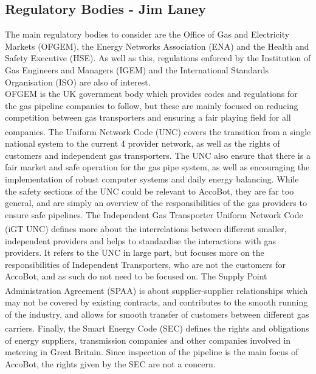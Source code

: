 \documentclass[11pt]{article}		%
\newcommand{\supercite}[1]{\textsuperscript{\cite{#1}}}		%
\begin{document}
		\subsection[Regulatory Bodies]{Regulatory Bodies - Jim Laney}
			
			The main regulatory bodies to consider are the Office of Gas and Electricity Markets (OFGEM), the Energy Networks Association (ENA) and the Health and Safety Executive (HSE).
			As well as this, regulations enforced by the Institution of Gas Engineers and Managers (IGEM) and the International Standards Organisation (ISO) are also of interest.
 			\\
			OFGEM is the UK government body which provides codes and regulations for the gas pipeline companies to follow, but these are mainly focused on reducing competition between gas transporters and ensuring a fair playing field for all companies.
			The Uniform Network Code (UNC)\supercite{joint2005uniform} covers the transition from a single national system to the current 4 provider network, as well as the rights of customers and independent gas transporters.
			The UNC also ensure that there is a fair market and safe operation for the gas pipe system, as well as encouraging the implementation of robust computer systems and daily energy balancing.
			While the safety sections of the UNC could be relevant to AccoBot, they are far too general, and are simply an overview of the responsibilities of the gas providers to ensure safe pipelines.
			The Independent Gas Transporter Uniform Network Code (iGT UNC)\supercite{igt2021independent} defines more about the interrelations between different smaller, independent providers and helps to standardise the interactions with gas providers.
			It refers to the UNC in large part, but focuses more on the responsibilities of Independent Transporters, who are not the customers for AccoBot, and as such do not need to be focused on.
			The Supply Point Administration Agreement (SPAA)\supercite{spaa2021supply} is about supplier-supplier relationships which may not be covered by existing contracts, and contributes to the smooth running of the industry, and allows for smooth transfer of customers between different gas carriers.
			Finally, the Smart Energy Code (SEC)\supercite{smart2021smart} defines the rights and obligations of energy suppliers, transmission companies and other companies involved in metering in Great Britain.
			Since inspection of the pipeline is the main focus of AccoBot, the rights given by the SEC are not a concern.
			\\
\end{document}
